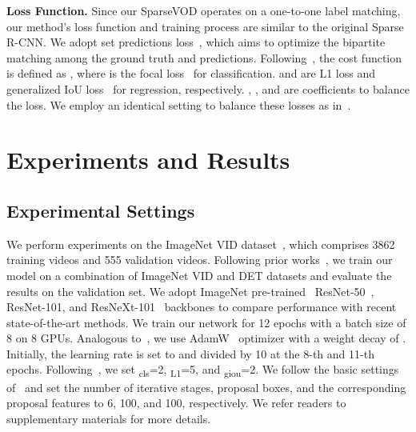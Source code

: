\documentclass{bmvc2k}
\begin{document}
\vspace{3pt}
\noindent \textbf{Loss Function.}
\label{subsec:loss_function}
Since our SparseVOD operates on a one-to-one label matching, our method's loss function and training process are similar to the original Sparse R-CNN. We adopt set predictions loss~\cite{carion2020end, zhu2020deformable, he2021end}, which aims to optimize the bipartite matching among the ground truth and predictions. Following~\cite{he2021end, sun2021sparse, carion2020end}, the cost function is defined as , where  is the focal loss~\cite{lin2017focal} for classification.  and  are L1 loss and  generalized IoU loss~\cite{rezatofighi2019generalized} for regression, respectively. , , and  are coefficients to balance the loss. We employ an identical setting to balance these losses as in~\cite{sun2021sparse}.
\vspace{-15pt}

\section{Experiments and Results}
\label{sec:experiments}
\vspace{-5pt}
\subsection{Experimental Settings}
\label{subsec:experimental setup}
We perform experiments on the ImageNet VID dataset~\cite{russakovsky2015imagenet}, which comprises 3862 training videos and 555 validation videos. Following prior works~\cite{cui2021tf, wu2019sequence, zhu2017flow}, we train our model on a combination of ImageNet VID and DET datasets and evaluate the results on the validation set. We adopt ImageNet pre-trained~\cite{deng2009imagenet} ResNet-50~\cite{he2016deep}, ResNet-101, and ResNeXt-101~\cite{xie2017aggregated} backbones to compare performance with recent state-of-the-art methods. We train our network for 12 epochs with a batch size of 8 on 8 GPUs. Analogous to~\cite{sun2021sparse}, we use AdamW~\cite{loshchilov2017decoupled} optimizer with a weight decay of .  Initially, the learning rate is set to  and divided by 10 at the 8-th and 11-th epochs. Following~\cite{sun2021sparse, carion2020end, zhu2020deformable}, we set \textsubscript{cls}=2, \textsubscript{L1}=5, and \textsubscript{giou}=2. We follow the basic settings of~\cite{sun2021sparse} and set the number of iterative stages, proposal boxes, and the corresponding proposal features to 6, 100, and 100, respectively. We refer readers to supplementary materials for more details. 
\end{document}
